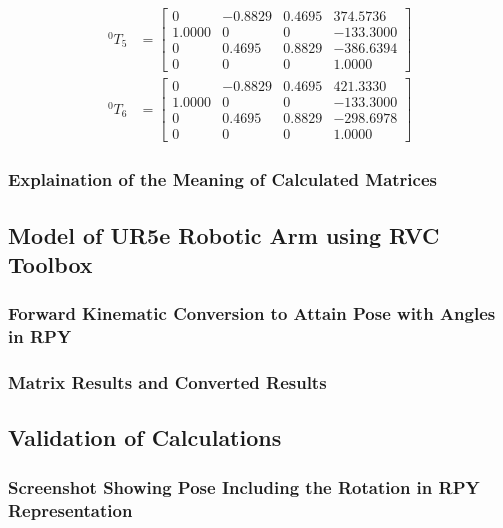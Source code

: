\documentclass[12pt]{article}
\begin{document}
\begin{equation*}
\begin{split}
        ^{0}T_{5} & = \begin{bmatrix}
                          0      & -0.8829 & 0.4695 & 374.5736  \\
                          1.0000 & 0       & 0      & -133.3000 \\
                          0      & 0.4695  & 0.8829 & -386.6394 \\
                          0      & 0       & 0      & 1.0000
                      \end{bmatrix}   \\
        ^{0}T_{6} & = \begin{bmatrix}
                          0      & -0.8829 & 0.4695 & 421.3330  \\
                          1.0000 & 0       & 0      & -133.3000 \\
                          0      & 0.4695  & 0.8829 & -298.6978 \\
                          0      & 0       & 0      & 1.0000
                      \end{bmatrix}
    \end{split}
\end{equation*}
\subsubsection{Explaination of the Meaning of Calculated Matrices}



\subsection{Model of UR5e Robotic Arm using RVC Toolbox}
\subsubsection{Forward Kinematic Conversion to Attain Pose with Angles in RPY}
\subsubsection{Matrix Results and Converted Results}
\subsection{Validation of Calculations}
\subsubsection{Screenshot Showing Pose Including the Rotation in RPY Representation}
\end{document}
